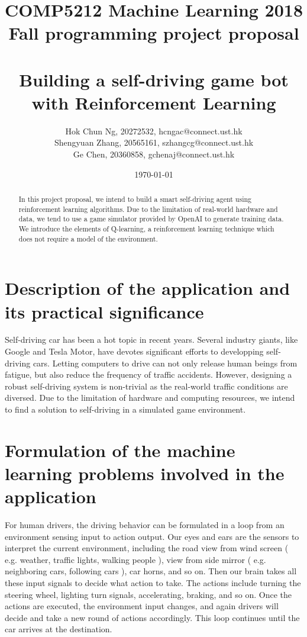 \documentclass[a4paper]{article}
\title{COMP5212 Machine Learning 2018 Fall programming project proposal \\ 
       \ \ \ \ \\
       Building a self-driving game bot with Reinforcement Learning}
\author{Hok Chun Ng, 20272532, hcngac@connect.ust.hk \\
        Shengyuan Zhang, 20565161, szhangcg@connect.ust.hk \\
        Ge Chen, 20360858, gchenaj@connect.ust.hk}
\date{\today}
\begin{document}
\maketitle

\begin{abstract}
In this project proposal, we intend to build a smart self-driving agent using
reinforcement learning algorithms. Due to the limitation of real-world hardware
and data, we tend to use a game simulator provided by OpenAI to generate training
data. We introduce the elements of Q-learning, a reinforcement learning technique
which does not require a model of the environment.
\end{abstract}

\section{Description of the application and its practical significance}

Self-driving car has been a hot topic in recent years. Several industry giants,
like Google and Tesla Motor, have devotes significant efforts to developping
self-driving cars. Letting computers to drive
can not only release human beings from fatigue, but also reduce the frequency of
traffic accidents. However, designing a robust self-driving system is non-trivial
as the real-world traffic conditions are diversed. Due to the limitation of
hardware and computing resources, we intend to find a solution to self-driving in
a simulated game environment.


\section{Formulation of the machine learning problems involved in the application}

For human drivers, the driving behavior can be formulated in a loop from an environment
sensing input to action output. Our eyes and ears are the sensors to interpret the
current environment, including the road view from wind screen ( e.g. weather, traffic lights,
walking people ), view from side mirror ( e.g. neighboring cars, following cars ),
car horns, and so on. Then our brain takes all these input signals to decide what action
to take. The actions include turning the steering wheel, lighting turn signals, accelerating,
braking, and so on. Once the actions are executed, the environment input changes, and again
drivers will decide and take a new round of actions accordingly. This loop continues until
the car arrives at the destination.
\end{document}
